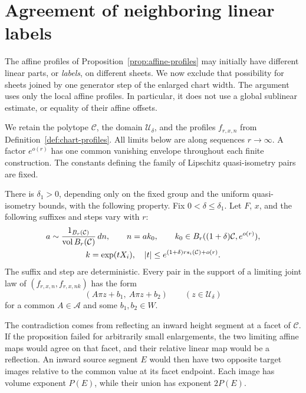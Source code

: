 \section{Agreement of neighboring linear labels}\label{sec:neighbor-labels}

The affine profiles of Proposition~\ref{prop:affine-profiles} may initially
have different linear parts, or \emph{labels}, on different sheets.
We now exclude that possibility
for sheets joined by one generator step of the enlarged chart width.
The argument uses only the local affine profiles.  In particular, it does
not use a global sublinear estimate, or equality of their affine offsets.

We retain the polytope $\mathcal C$, the domain $\mathcal U_\delta$, and
the profiles $f_{r,x,n}$ from Definition~\ref{def:chart-profiles}.
All limits below are along sequences $r\to\infty$.  A factor $e^{o(r)}$
has one common vanishing envelope throughout each finite construction.
The constants defining the family of Lipschitz quasi-isometry pairs are
fixed.

\begin{proposition}\label{prop:neighbor-labels}
There is $\delta_1>0$, depending only on the fixed group and the uniform
quasi-isometry bounds, with the following property.  Fix
$0<\delta\leq\delta_1$.  Let $F$, $x$, and the following suffixes and steps
vary with $r$:
\[
 \begin{gathered}
 a\sim\frac{1_{B_r(\mathcal C)}}{\operatorname{vol} B_r(\mathcal C)}\,dn,
 \qquad n=ak_0,\qquad
 k_0\in B_r((1+\delta)\mathcal C,e^{o(r)}),\\
 k=\exp(tX_i),
 \quad |t|\leq e^{(1+\delta)r s_i(\mathcal C)+o(r)}.
 \end{gathered}
\]
The suffix and step are deterministic.  Every pair in the support of a
limiting joint law of $(f_{r,x,n},f_{r,x,nk})$ has the form
\[
 (A\pi z+b_1,\ A\pi z+b_2)\qquad(z\in\mathcal U_\delta)
\]
for a common $A\in\mathcal A$ and some $b_1,b_2\in W$.
\end{proposition}

The contradiction comes from reflecting an inward height segment at a
facet of $\mathcal C$.  If the proposition failed for arbitrarily small
enlargements, the two limiting affine maps would agree on that facet,
and their relative linear map would be a reflection.  An inward source
segment $E$ would then have two opposite target images relative to the
common value at its facet endpoint.  Each image has volume exponent
$P(E)$, while their union has exponent $2P(E)$.

